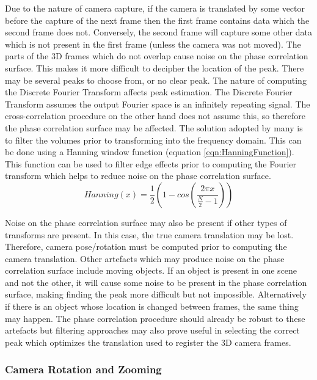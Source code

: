 Due to the nature of camera capture, if the camera is translated by some vector before the capture of the next frame then the first frame contains data which the second frame does not. Conversely, the second frame will capture some other data which is not present in the first frame (unless the camera was not moved). The parts of the 3D frames which do not overlap cause noise on the phase correlation surface. This makes it more difficult to decipher the location of the peak. There may be several peaks to choose from, or no clear peak. The nature of computing the Discrete Fourier Transform affects peak estimation. The Discrete Fourier Transform assumes the output Fourier space is an infinitely repeating signal. The cross-correlation procedure on the other hand does not assume this, so therefore the phase correlation surface may be affected. The solution adopted by many is to filter the volumes prior to transforming into the frequency domain. This can be done using a Hanning window function (equation \ref{eqn:HanningFunction}). This function can be used to filter edge effects prior to computing the Fourier transform which helps to reduce noise on the phase correlation surface. \\

\begin{equation} \label{eqn:HanningFunction}
Hanning(x) = \frac{1}{2}\left(1 - cos\left(\frac{2\pi x}{\frac{N}{2} - 1}\right)\right)
\end{equation}

Noise on the phase correlation surface may also be present if other types of transforms are present. In this case, the true camera translation may be lost. Therefore, camera pose/rotation must be computed prior to computing the camera translation. Other artefacts which may produce noise on the phase correlation surface include moving objects. If an object is present in one scene and not the other, it will cause some noise to be present in the phase correlation surface, making finding the peak more difficult but not impossible. Alternatively if there is an object whose location is changed between frames, the same thing may happen. The phase correlation procedure should already be robust to these artefacts but filtering approaches may also prove useful in selecting the correct peak which optimizes the translation used to register the 3D camera frames. \\

\subsubsection{Camera Rotation and Zooming}
\label{Sec:RoteZoomingSection}

